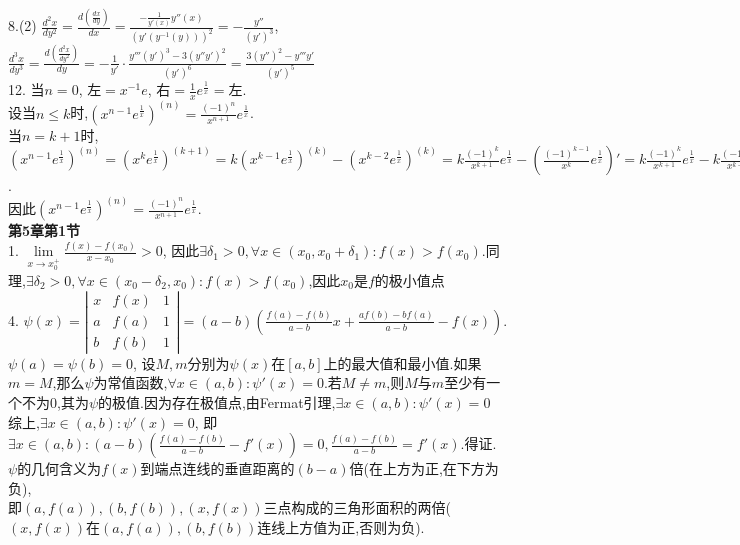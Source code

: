 \documentclass[12pt, a4paper, oneside]{ctexart}
\begin{document}
    8.(2) $\frac{d^2x}{dy^2}=\frac{d(\frac{dx}{dy})}{dx}=\frac{-\frac{1}{y'(x)}y''(x)}{(y'(y^{-1}(y)))^2}=-\frac{y''}{(y')^3}$, $\frac{d^3x}{dy^3}=\frac{d(\frac{d^2x}{dy^2})}{dy}=-\frac{1}{y'}\cdot\frac{y'''(y')^3-3(y''y')^2}{(y')^6}=\frac{3(y'')^2-y'''y'}{(y')^5}$\\
    12. 当$n=0$, $\text{左}=x^{-1}e$, $\text{右}=\frac1xe^{\frac1x}=\text{左}$.\\
    设当$n\leq k$时,$(x^{n-1}e^{\frac1x})^{(n)}=\frac{(-1)^n}{x^{n+1}}e^{\frac1x}$.\\
    当$n=k+1$时,$(x^{n-1}e^{\frac1x})^{(n)}=(x^{k}e^{\frac1x})^{(k+1)}=k(x^{k-1}e^{\frac1x})^{(k)}-(x^{k-2}e^{\frac1x})^{(k)}=k\frac{(-1)^k}{x^{k+1}}e^{\frac1x}-(\frac{(-1)^{k-1}}{x^{k}}e^{\frac1x})'=k\frac{(-1)^k}{x^{k+1}}e^{\frac1x}-k\frac{(-1)^k}{x^{k+1}}e^{\frac1x}=0$.\\
    因此$(x^{n-1}e^{\frac1x})^{(n)}=\frac{(-1)^n}{x^{n+1}}e^{\frac1x}$.\\
    
    \textbf{第5章第1节}\\
    1. $\lim\limits_{x\to x_0^+}\frac{f(x)-f(x_0)}{x-x_0}>0$, 因此$\exists \delta_1>0,\forall x\in(x_0,x_0+\delta_1):f(x)>f(x_0)$.同理,$\exists \delta_2>0,\forall x\in(x_0-\delta_2,x_0):f(x)>f(x_0)$,因此$x_0$是$f$的极小值点\\
    4. $\psi(x)=\left|\begin{matrix}x&f(x)&1\\a&f(a)&1\\b&f(b)&1\end{matrix}\right|=(a-b)(\frac{f(a)-f(b)}{a-b}x+\frac{af(b)-bf(a)}{a-b}-f(x))$.\\
    $\psi(a)=\psi(b)=0$, 设$M,m$分别为$\psi(x)$在$[a,b]$上的最大值和最小值.如果$m=M$,那么$\psi$为常值函数,$\forall x\in(a,b):\psi'(x)=0$.若$M\neq m$,则$M$与$m$至少有一个不为$0$,其为$\psi$的极值.因为存在极值点,由Fermat引理,$\exists x\in(a,b):\psi'(x)=0$\\
    综上,$\exists x\in (a,b):\psi'(x)=0$, 即$\exists x\in (a,b):(a-b)(\frac{f(a)-f(b)}{a-b}-f'(x))=0,\frac{f(a)-f(b)}{a-b}=f'(x)$.得证.\\
    $\psi$的几何含义为$f(x)$到端点连线的垂直距离的$(b-a)$倍(在上方为正,在下方为负),\\
    即$(a,f(a)),(b,f(b)),(x,f(x))$三点构成的三角形面积的两倍($(x,f(x))$在$(a,f(a)),(b,f(b))$连线上方值为正,否则为负).
\end{document}

